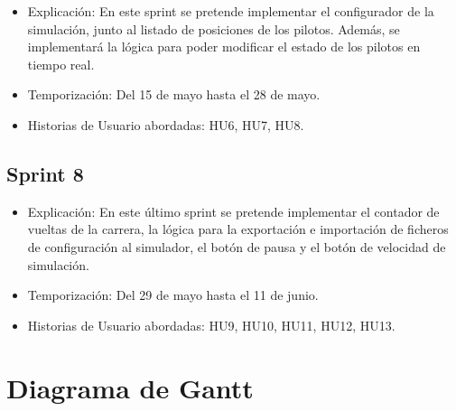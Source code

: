 \begin{itemize}
    \item Explicación: En este sprint se pretende implementar el configurador de la simulación, junto al listado de posiciones de los pilotos. Además, se implementará la lógica para poder modificar el estado de los pilotos en tiempo real.
    
    
    
    \item Temporización: Del 15 de mayo hasta el 28 de mayo.
    \item Historias de Usuario abordadas: HU6, HU7, HU8.
\end{itemize}

\subsection{Sprint 8}

\begin{itemize}
    \item Explicación: En este último sprint se pretende implementar el contador de vueltas de la carrera, la lógica para la exportación e importación de ficheros de configuración al simulador, el botón de pausa y el botón de velocidad de simulación.
    \item Temporización: Del 29 de mayo hasta el 11 de junio.
    \item Historias de Usuario abordadas: HU9, HU10, HU11, HU12, HU13.
\end{itemize}



\newpage
\section{Diagrama de Gantt}


